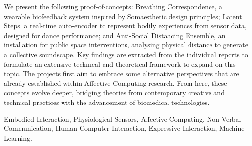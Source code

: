 We present the following proof-of-concepts: Breathing Correspondence, a wearable biofeedback system inspired by Somaesthetic design principles; Latent Steps, a real-time auto-encoder to represent bodily experiences from sensor data, designed for dance performance; and Anti-Social Distancing Ensemble, an installation for public space interventions, analysing physical distance to generate a collective soundscape. Key findings are extracted from the individual reports to formulate an extensive technical and theoretical framework to expand on this topic. The projects first aim to embrace some alternative perspectives that are already established within Affective Computing research. From here, these concepts evolve deeper, bridging theories from contemporary creative and technical practices with the advancement of biomedical technologies.


\begin{keywords}
Embodied Interaction, Physiological Sensors, Affective Computing, Non-Verbal Communication, Human-Computer Interaction, Expressive Interaction, Machine Learning.
\end{keywords} 